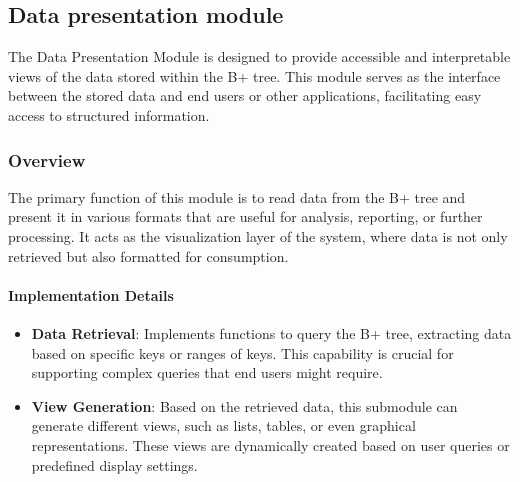\subsection{Data presentation module}
The Data Presentation Module is designed to provide accessible and interpretable views of the data stored within the B+ tree. This module serves as the interface between the stored data and end users or other applications, facilitating easy access to structured information.

\subsubsection{Overview}
The primary function of this module is to read data from the B+ tree and present it in various formats that are useful for analysis, reporting, or further processing. It acts as the visualization layer of the system, where data is not only retrieved but also formatted for consumption.

\paragraph{Implementation Details}
\begin{itemize}
    \item \textbf{Data Retrieval}: Implements functions to query the B+ tree, extracting data based on specific keys or ranges of keys. This capability is crucial for supporting complex queries that end users might require.
    \item \textbf{View Generation}: Based on the retrieved data, this submodule can generate different views, such as lists, tables, or even graphical representations. These views are dynamically created based on user queries or predefined display settings.
\end{itemize}